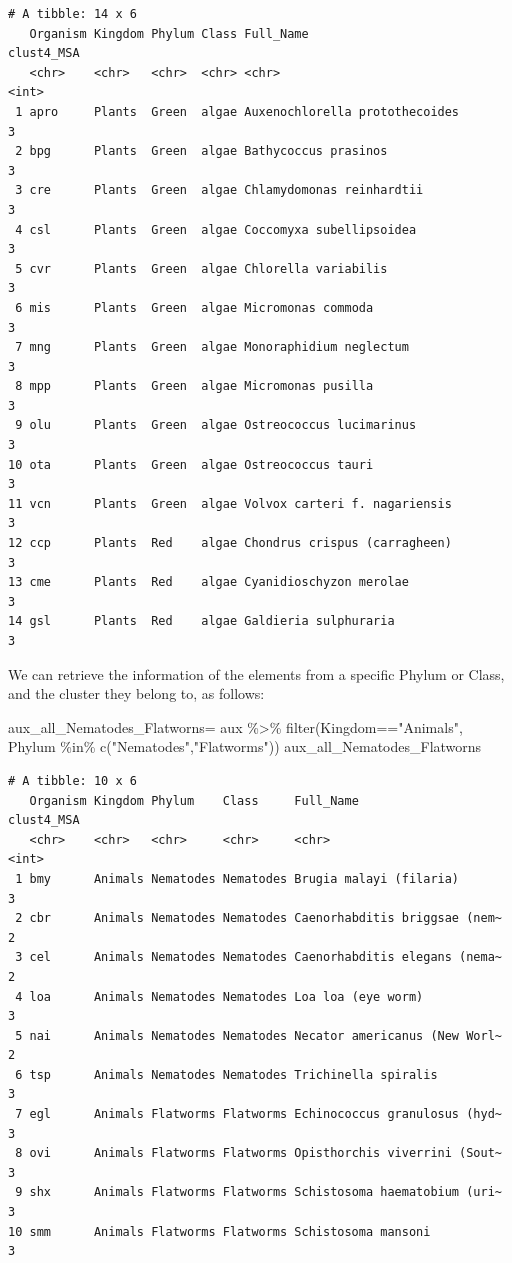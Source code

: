 \documentclass[
  letterpaper,
  DIV=11,
  numbers=noendperiod]{scrreprt}
\newenvironment{Shaded}{}{}
\newcommand{\FunctionTok}[1]{\textcolor[rgb]{0.38,0.69,0.94}{#1}}
\newcommand{\NormalTok}[1]{\textcolor[rgb]{0.67,0.70,0.75}{#1}}
\newcommand{\OtherTok}[1]{\textcolor[rgb]{0.15,0.68,0.38}{#1}}
\newcommand{\SpecialCharTok}[1]{\textcolor[rgb]{0.34,0.71,0.76}{#1}}
\newcommand{\StringTok}[1]{\textcolor[rgb]{0.60,0.76,0.47}{#1}}
\begin{document}
\begin{verbatim}
# A tibble: 14 x 6
   Organism Kingdom Phylum Class Full_Name                      clust4_MSA
   <chr>    <chr>   <chr>  <chr> <chr>                               <int>
 1 apro     Plants  Green  algae Auxenochlorella protothecoides          3
 2 bpg      Plants  Green  algae Bathycoccus prasinos                    3
 3 cre      Plants  Green  algae Chlamydomonas reinhardtii               3
 4 csl      Plants  Green  algae Coccomyxa subellipsoidea                3
 5 cvr      Plants  Green  algae Chlorella variabilis                    3
 6 mis      Plants  Green  algae Micromonas commoda                      3
 7 mng      Plants  Green  algae Monoraphidium neglectum                 3
 8 mpp      Plants  Green  algae Micromonas pusilla                      3
 9 olu      Plants  Green  algae Ostreococcus lucimarinus                3
10 ota      Plants  Green  algae Ostreococcus tauri                      3
11 vcn      Plants  Green  algae Volvox carteri f. nagariensis           3
12 ccp      Plants  Red    algae Chondrus crispus (carragheen)           3
13 cme      Plants  Red    algae Cyanidioschyzon merolae                 3
14 gsl      Plants  Red    algae Galdieria sulphuraria                   3
\end{verbatim}

We can retrieve the information of the elements from a specific Phylum
or Class, and the cluster they belong to, as follows:

\begin{Shaded}
\begin{Highlighting}[]
\NormalTok{aux\_all\_Nematodes\_Flatworns}\OtherTok{=}\NormalTok{ aux }\SpecialCharTok{\%\textgreater{}\%} 
  \FunctionTok{filter}\NormalTok{(Kingdom}\SpecialCharTok{==}\StringTok{"Animals"}\NormalTok{,}
\NormalTok{         Phylum }\SpecialCharTok{\%in\%} \FunctionTok{c}\NormalTok{(}\StringTok{"Nematodes"}\NormalTok{,}\StringTok{"Flatworms"}\NormalTok{))}
\NormalTok{aux\_all\_Nematodes\_Flatworns}
\end{Highlighting}
\end{Shaded}

\begin{verbatim}
# A tibble: 10 x 6
   Organism Kingdom Phylum    Class     Full_Name                     clust4_MSA
   <chr>    <chr>   <chr>     <chr>     <chr>                              <int>
 1 bmy      Animals Nematodes Nematodes Brugia malayi (filaria)                3
 2 cbr      Animals Nematodes Nematodes Caenorhabditis briggsae (nem~          2
 3 cel      Animals Nematodes Nematodes Caenorhabditis elegans (nema~          2
 4 loa      Animals Nematodes Nematodes Loa loa (eye worm)                     3
 5 nai      Animals Nematodes Nematodes Necator americanus (New Worl~          2
 6 tsp      Animals Nematodes Nematodes Trichinella spiralis                   3
 7 egl      Animals Flatworms Flatworms Echinococcus granulosus (hyd~          3
 8 ovi      Animals Flatworms Flatworms Opisthorchis viverrini (Sout~          3
 9 shx      Animals Flatworms Flatworms Schistosoma haematobium (uri~          3
10 smm      Animals Flatworms Flatworms Schistosoma mansoni                    3
\end{verbatim}
\end{document}
